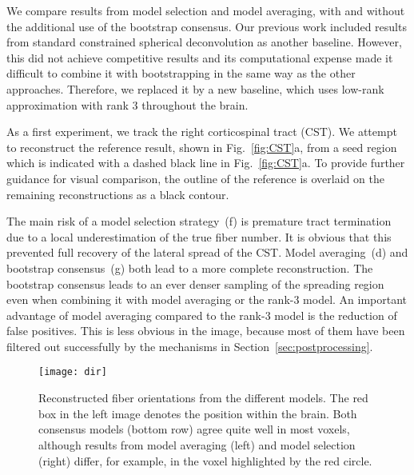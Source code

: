 We compare results from model selection and model averaging, with and without the additional use of the bootstrap consensus. Our previous work \cite{Gruen:2021} included results from standard constrained spherical deconvolution as another baseline. However, this did not achieve competitive results and its computational expense made it difficult to combine it with bootstrapping in the same way as the other approaches. Therefore, we replaced it by a new baseline, which uses low-rank approximation with rank 3 throughout the brain.

As a first experiment, we track the right corticospinal tract (CST). We attempt to reconstruct the reference result, shown in Fig.~\ref{fig:CST}a, from a seed
region which is indicated with a dashed black line in Fig.~\ref{fig:CST}a. To provide further guidance for visual comparison, the outline of the reference is overlaid on the remaining reconstructions as a black contour.

The main risk of a model selection strategy~(f) is premature tract termination due to a local underestimation of the true fiber number. It is obvious that this prevented full recovery of the lateral spread of the CST. Model averaging~(d) and bootstrap consensus~(g) both lead to a more complete reconstruction. The bootstrap consensus leads to an ever denser sampling of the spreading region even when combining it with model averaging or the rank-3 model. An important advantage of model averaging compared to the rank-3 model is the reduction of false positives. This is less obvious in the image, because most of them have been filtered out successfully by the mechanisms in Section~\ref{sec:postprocessing}.

\begin{figure*}
	\centering
	\texttt{[image: dir]}
	\caption{Reconstructed fiber orientations from the different models. The
          red box in the left image denotes the position within the brain. Both consensus
          models (bottom row) agree quite well in most voxels, although results from model averaging (left) and model selection (right) differ, for example, in the voxel highlighted by the red circle.}
	\label{fig:directions}
\end{figure*}

